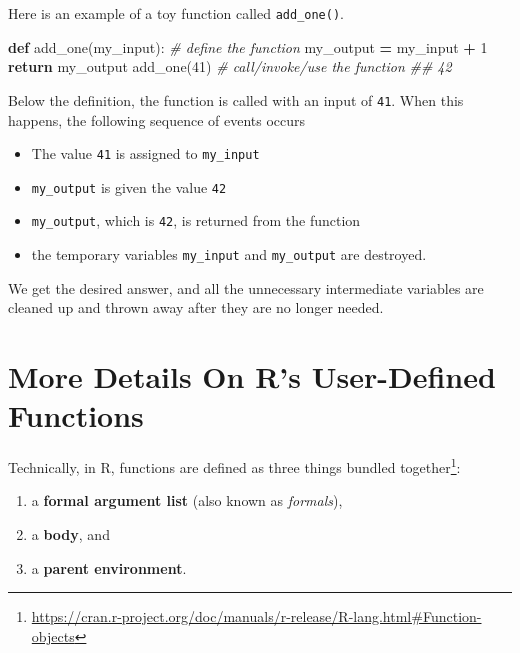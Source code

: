 \documentclass[12pt,krantz2]{krantz}
\makeatletter
\newenvironment{Shaded}{\begin{snugshade}}{\end{snugshade}}
\newcommand{\CommentTok}[1]{\textcolor[rgb]{0.37,0.37,0.37}{\textit{#1}}}
\newcommand{\ControlFlowTok}[1]{\textcolor[rgb]{0.27,0.27,0.27}{\textbf{#1}}}
\newcommand{\DecValTok}[1]{\textcolor[rgb]{0.06,0.06,0.06}{#1}}
\newcommand{\KeywordTok}[1]{\textcolor[rgb]{0.27,0.27,0.27}{\textbf{#1}}}
\newcommand{\NormalTok}[1]{#1}
\newcommand{\OperatorTok}[1]{\textcolor[rgb]{0.43,0.43,0.43}{\textbf{#1}}}
\providecommand{\tightlist}{%
  \setlength{\itemsep}{0pt}\setlength{\parskip}{0pt}}
\renewcommand{\href}[2]{#2\footnote{\url{#1}}}
\newenvironment{kframe}{%
\medskip{}
\setlength{\fboxsep}{.8em}
 \def\at@end@of@kframe{}%
 \ifinner\ifhmode%
  \def\at@end@of@kframe{\end{minipage}}%
  \begin{minipage}{\columnwidth}%
 \fi\fi%
 \def\FrameCommand##1{\hskip\@totalleftmargin \hskip-\fboxsep
 \colorbox{shadecolor}{##1}\hskip-\fboxsep
     \hskip-\linewidth \hskip-\@totalleftmargin \hskip\columnwidth}%
 \MakeFramed {\advance\hsize-\width
   \@totalleftmargin\z@ \linewidth\hsize
   \@setminipage}}%
 {\par\unskip\endMakeFramed%
 \at@end@of@kframe}
\renewenvironment{Shaded}{\begin{kframe}}{\end{kframe}}
\makeatother
\begin{document}
Here is an example of a toy function called \texttt{add\_one()}.

\begin{Shaded}
\begin{Highlighting}[]
\KeywordTok{def}\NormalTok{ add_one(my_input):  }\CommentTok{# define the function}
\NormalTok{    my_output }\OperatorTok{=}\NormalTok{ my_input }\OperatorTok{+} \DecValTok{1}
    \ControlFlowTok{return}\NormalTok{ my_output}
\NormalTok{add_one(}\DecValTok{41}\NormalTok{) }\CommentTok{# call/invoke/use the function }
\CommentTok{## 42}
\end{Highlighting}
\end{Shaded}

Below the definition, the function is called with an input of \texttt{41}. When this happens, the following sequence of events occurs

\begin{itemize}
\tightlist
\item
  The value \texttt{41} is assigned to \texttt{my\_input}
\item
  \texttt{my\_output} is given the value \texttt{42}
\item
  \texttt{my\_output}, which is \texttt{42}, is returned from the function
\item
  the temporary variables \texttt{my\_input} and \texttt{my\_output} are destroyed.
\end{itemize}

We get the desired answer, and all the unnecessary intermediate variables are cleaned up and thrown away after they are no longer needed.

\hypertarget{more-details-on-rs-user-defined-functions}{%
\section{More Details On R's User-Defined Functions}\label{more-details-on-rs-user-defined-functions}}

Technically, in R, functions are \href{https://cran.r-project.org/doc/manuals/r-release/R-lang.html\#Function-objects}{defined as three things bundled together}:

\begin{enumerate}
\def\labelenumi{\arabic{enumi}.}
\tightlist
\item
  a \textbf{formal argument list} (also known as \emph{formals}),
\item
  a \textbf{body}, and
\item
  a \textbf{parent environment}.
\end{enumerate}
\end{document}
